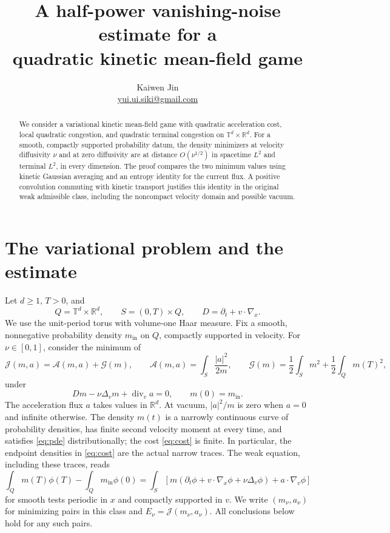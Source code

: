 \documentclass[11pt]{article}
\title{A half-power vanishing-noise estimate for a\\
quadratic kinetic mean-field game}
\author{Kaiwen Jin\\
\small\href{mailto:yui.ui.siki@gmail.com}{yui.ui.siki@gmail.com}}
\date{}
\newcommand{\T}{\mathbb T}
\newcommand{\R}{\mathbb R}
\newcommand{\mi}{m_{\mathrm{in}}}
\newcommand{\A}{\mathcal A}
\newcommand{\J}{\mathcal J}
\newcommand{\G}{\mathcal G}
\newcommand{\D}{D}
\begin{document}
\maketitle

\begin{abstract}
We consider a variational kinetic mean-field game with quadratic acceleration
cost, local quadratic congestion, and quadratic terminal congestion on
$\T^d\times\R^d$. For a smooth, compactly supported probability datum, the
density minimizers at velocity diffusivity $\nu$ and at zero diffusivity
are at distance $O(\nu^{1/2})$ in spacetime $L^2$ and terminal $L^2$, in
every dimension. The proof compares the two minimum values using kinetic
Gaussian averaging and an entropy identity for the current flux.
A positive convolution commuting with kinetic transport justifies this
identity in the original weak admissible class, including the noncompact
velocity domain and possible vacuum.
\end{abstract}

\section{The variational problem and the estimate}

Let $d\geq1$, $T>0$, and
\[
 Q=\T^d\times\R^d,\qquad S=(0,T)\times Q,\qquad
 \D=\partial_t+v\cdot\nabla_x.
\]
We use the unit-period torus with volume-one Haar measure.
Fix a smooth, nonnegative probability density $\mi$ on $Q$, compactly
supported in velocity. For $\nu\in[0,1]$, consider the minimum of
\begin{equation}\label{eq:cost}
 \J(m,a)=\A(m,a)+\G(m),\qquad
 \A(m,a)=\int_S\frac{|a|^2}{2m},\qquad
 \G(m)=\frac12\int_Sm^2+\frac12\int_Qm(T)^2,
\end{equation}
under
\begin{equation}\label{eq:pde}
 \D m-\nu\Delta_vm+\operatorname{div}_va=0,\qquad m(0)=\mi.
\end{equation}
The acceleration flux $a$ takes values in $\R^d$.
At vacuum, $|a|^2/m$ is zero when $a=0$ and infinite otherwise.
The density $m(t)$ is a narrowly continuous curve of probability densities,
has finite second velocity moment at every time, and satisfies
\eqref{eq:pde} distributionally; the cost \eqref{eq:cost} is finite.
In particular, the endpoint densities in \eqref{eq:cost} are the actual
narrow traces. The weak equation, including these traces, reads
\begin{equation}\label{eq:weak}
 \int_Qm(T)\phi(T)-\int_Q\mi\phi(0)
 =\int_S\left[
 m(\partial_t\phi+v\cdot\nabla_x\phi+\nu\Delta_v\phi)
 +a\cdot\nabla_v\phi\right]
\end{equation}
for smooth tests periodic in $x$ and compactly supported in $v$.
We write $(m_\nu,a_\nu)$ for minimizing pairs in this class and
$E_\nu=\J(m_\nu,a_\nu)$. All conclusions below hold for any such pairs.
\end{document}
